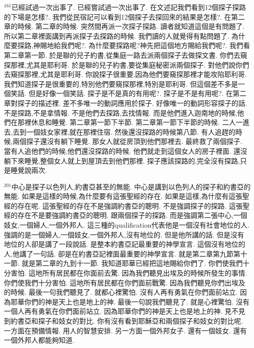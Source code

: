 \documentclass{book}
\begin{document}
$^{161}$已經試過一次出事了.
已經嘗試過一次出事了.
在文述記我們看到12個探子探路的下場是怎樣?.
我們從民宿記可以看到12個探子去探回來的結果是怎樣?.
在第二章的時候.
第二章的時候.
突然間再派一次探子探路.
讀者就知道這個是有問題了.
所以第二章裡面講到再派探子去探路的時候.
我們讀的人就覺得有點問題了.
為什麼要探路,神賜地給我們呢?.
為什麼要探路呢?神先把這個地方賜給我們呢?.
我們看第二章第一節.
於是聯的兒子約書,從集庭一路去派兩個探子去做探文書.
你們去窺探那裡,尤其是耶利哥.
於是聯的兒子約書,要從集庭秘密派兩個探子.
對他們說你們去窺探那裡,尤其是耶利哥.
你說探子很重要,因為他們要窺探那裡才能攻陷耶利哥.
我們知道探子是很重要的,特別他們要窺探那裡,特別是耶利哥.
但這個差不多是一個笑話.
但是好像一個笑話.
探子是不是真的有用呢?.
探子是不是有用呢?.
在第二章對探子的描述裡.
差不多唯一的動詞應用於探子.
好像唯一的動詞形容探子的話.
不是探路,不是拿情報.
不是他們去探路,去找情報.
而是他們進入迦南地的時候,他們在那裡休息和睡覺.
第二章第一節下半節.
第二章第一節下半節的時候.
二人一進去,去到一個妓女家裡,就在那裡住宿.
然後還沒探路的時候第八節.
有人追趕的時候,兩個探子還沒有躺下睡覺.
那女人就從房頂到他們那裡去.
最終救了兩個探子.
當有人追他們的時候,他們還沒探路的時候.
他們就走到這個女人的房子裡面.
還沒躺下來睡覺,整個女人就上到屋頂去到他們那裡.
探子應該探路的,完全沒有探路,只是睡覺說兩次.

$^{201}$中心是探子以色列人,約書亞甚至的無能.
中心是講到以色列人的探子和約書亞的無能.
如果是這樣的時候,為什麼要有這張聖經的存在.
如果是這樣,為什麼有這張聖經的存在呢.
這張聖經的存在不是強調約書亞的聰明.
不是強調探子的探路.
這張聖經的存在不是要強調約書亞的聰明.
跟兩個探子的探路.
而是強調第二張中心,一個妓女,一個婦人,一個外邦人.
這三種的qualification代表他是一個沒有社會地位的人.
強調的是一個婦人,一個妓女,一個外邦人,沒有地位的.
但是他所講的話.
但是沒有地位的人卻是講了一段說話.
是整本約書亞記最重要的神學宣言.
這個沒有地位的人,他講了一句話.
卻是在約書亞記裡面最重要的神學宣言.
就是第二章第九節第十一節.
就是第二章的九到十一節.
我知道耶華已經把這地賜給你們了.
你們使我們十分害怕.
這地所有居民都在你面前去驚.
因為我們聽見出埃及的時候所發生的事情.
你們使我們十分害怕.
這地所有居民都在你們面前戰驚.
因為我們聽見你們出埃及的時候.
最後一句我們聽見了.
就都心裡驚怕.
沒有人再有勇氣在你們面前站立.
因為耶華你們的神是天上也是地上的神.
最後一句說我們聽見了.
就是心裡驚怕.
沒有一個人再有勇氣在你們面前站立.
因為耶華你們的神是天上也是地上的神.
見不見到約書亞和探子和妓女的對比.
你有沒有看到耶穌亞和兩個探子和妓女的對比呢.
一方面在預備情報.
用人的智慧安排.
另一方面一個外邦女子.
還有一個妓女.
還有一個外邦人都能夠知道.
\end{document}
